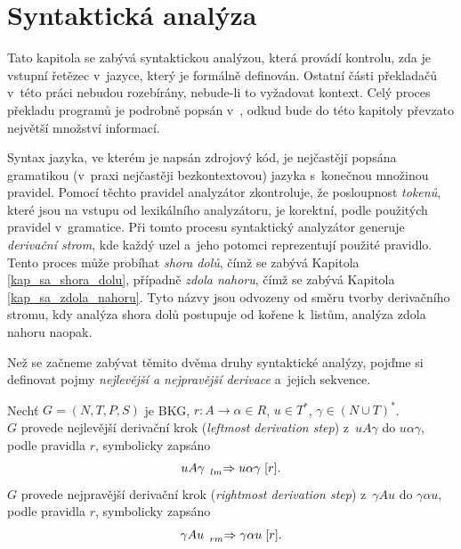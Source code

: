 \chapter{Syntaktická analýza}\label{kap_teorie_sa}
Tato kapitola se zabývá syntaktickou analýzou, která provádí kontrolu, zda je vstupní řetězec v~jazyce, který je formálně definován.
Ostatní části překladačů v~této práci nebudou rozebírány, nebude-li to vyžadovat kontext.
Celý proces překladu programů je podrobně popsán v~\cite{medunaElementsOfCompDesign}, odkud bude do této kapitoly převzato největší množství informací.

Syntax jazyka, ve kterém je napsán zdrojový kód, je nejčastěji popsána gramatikou (v~praxi nejčastěji bezkontextovou) jazyka s~konečnou množinou pravidel.
Pomocí těchto pravidel analyzátor zkontroluje, že posloupnost \emph{tokenů}, které jsou na vstupu od lexikálního analyzátoru, je korektní, podle použitých pravidel v~gramatice.
Při tomto procesu syntaktický analyzátor generuje \emph{derivační strom}, kde každý uzel a~jeho potomci reprezentují použité pravidlo.
Tento proces může probíhat \emph{shora dolů}, čímž se zabývá Kapitola \ref{kap_sa_shora_dolu}, případně \emph{zdola nahoru}, čímž se zabývá Kapitola \ref{kap_sa_zdola_nahoru}.
Tyto názvy jsou odvozeny od směru tvorby derivačního stromu, kdy analýza shora dolů postupuje od kořene k~listům, analýza zdola nahoru naopak.

Než se začneme zabývat těmito dvěma druhy syntaktické analýzy, pojďme si definovat pojmy \emph{nejlevější a nejpravější derivace} a~jejich sekvence.
\begin{definition}\label{def_nejlevejsi_nejpravejsi_der}
     Nechť $G = (N, T, P, S)$ je BKG, $r: A \rightarrow \alpha \in R$, $u \in T^*$, $\gamma \in (N \cup T)^*$. \\ 
     $G$ provede nejlevější derivační krok (\emph{leftmost derivation step}) z~$uA\gamma$ do $u\alpha\gamma$, podle pravidla $r$, symbolicky zapsáno
    \begin{equation*}
        uA\gamma\; \prescript{}{\scriptstyle lm}{\Rightarrow}\; u\alpha\gamma \; [r].
    \end{equation*}
    $G$ provede nejpravější derivační krok (\emph{rightmost derivation step}) z~$\gamma Au$ do $\gamma \alpha u$, podle pravidla $r$, symbolicky zapsáno
    \begin{equation*}
        \gamma Au\; \prescript{}{\scriptstyle rm}{\Rightarrow}\; \gamma \alpha u\; [r].
    \end{equation*}
\end{definition}

